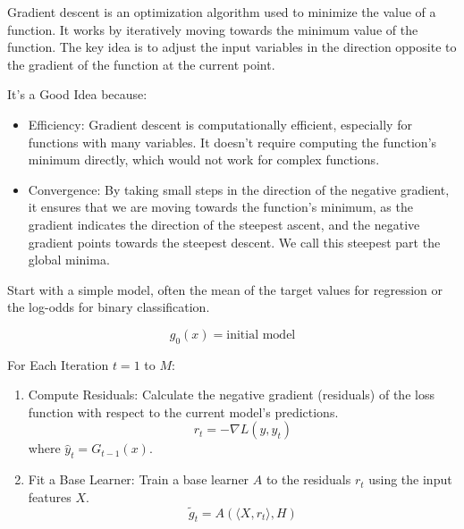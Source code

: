\documentclass[12pt]{article}
\begin{document}
\begin{enumerate}

Gradient descent is an optimization algorithm used to minimize the value of a function. It works by iteratively moving towards the minimum value of the function. The key idea is to adjust the input variables in the direction opposite to the gradient of the function at the current point.

It's a Good Idea because:

\begin{itemize}
    \item Efficiency: Gradient descent is computationally efficient, especially for functions with many variables. It doesn't require computing the function's minimum directly, which would not work for complex functions.
    \item Convergence: By taking small steps in the direction of the negative gradient, it ensures that we are moving towards the function's minimum, as the gradient indicates the direction of the steepest ascent, and the negative gradient points towards the steepest descent. We call this steepest part the global minima.
\end{itemize}


Start with a simple model, often the mean of the target values for regression or the log-odds for binary classification.

\[
g_0(x) = \text{initial model}
\]

For Each Iteration $t = 1$ to $M$:

\begin{enumerate}
    \item Compute Residuals: Calculate the negative gradient (residuals) of the loss function with respect to the current model's predictions.
    \[
    r_t = -\nabla L(y, \hat{y}_t)
    \]
    where \(\hat{y}_t = G_{t-1}(x)\).

    \item Fit a Base Learner: Train a base learner \(A\) to the residuals \(r_t\) using the input features \(X\).
    \[
    \tilde{g}_t = A(\langle X, r_t \rangle, H)
    \]


\end{enumerate}
\end{enumerate}
\end{document}
